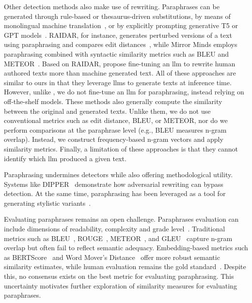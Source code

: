 Other detection methods also make use of rewriting. 
Paraphrases can be generated through rule-based or thesaurus-driven substitutions, by means of monolingual machine translation~\citep{zhou_paraphrase_2021}, or by explicitly prompting generative T5 or GPT models~\citep{kurt_pehlivanoglu_comparative_2024}.
RAIDAR, for instance, generates perturbed versions of a text using paraphrasing and compares edit distances~\citep{mao_raidar_2024}, while Mirror Minds employs paraphrasing combined with syntactic similarity metrics such as BLEU and METEOR~\citep{baradia_mirror_2025}. 
Based on RAIDAR, \citet{li_learning_2025} propose fine-tuning an \ac{llm} to rewrite human authored texts more than machine generated text.
All of these approaches are similar to ours in that they leverage \acp{llm} to generate texts at inference time. 
However, unlike \citet{li_learning_2025}, we do not fine-tune an \ac{llm} for paraphrasing, instead relying on off-the-shelf models.
These methods also generally compute the similarity between the original and generated texts. 
Unlike them, we do not use conventional metrics such as edit distance, BLEU, or METEOR, nor do we perform comparisons at the paraphrase level (e.g., BLEU measures n-gram overlap). 
Instead, we construct frequency-based n-gram vectors and apply similarity metrics.
Finally, a limitation of these approaches is that they cannot identify which \ac{llm} produced a given text.

Paraphrasing undermines detectors while also offering methodological utility. 
Systems like DIPPER~\citep{Krishna_dipper_2023} demonstrate how adversarial rewriting can bypass detection. 
At the same time, paraphrasing has been leveraged as a tool for generating stylistic variants~\citep{mao_raidar_2024,baradia_mirror_2025}.

Evaluating paraphrases remains an open challenge. 
Paraphrases evaluation can include dimensions of readability, complexity and grade level~\citep{Thomas_cross_topic_24}.
Traditional metrics such as BLEU~\citep{papineni_bleu_2001}, ROUGE~\citep{lin_rouge_2004}, METEOR~\citep{banerjee_METEOR_2005}, and GLEU~\citep{kurt_pehlivanoglu_comparative_2024} capture n-gram overlap but often fail to reflect semantic adequacy. 
Embedding-based metrics such as BERTScore~\citep{hanna_fine_grained_2021} and Word Mover's Distance~\citep{gohsen_captions_2023} offer more robust semantic similarity estimates, while human evaluation remains the gold standard~\citep{zhou_paraphrase_2021}. 
Despite this, no consensus exists on the best metric for evaluating paraphrasing. 
This uncertainty motivates further exploration of similarity measures for evaluating paraphrases.



